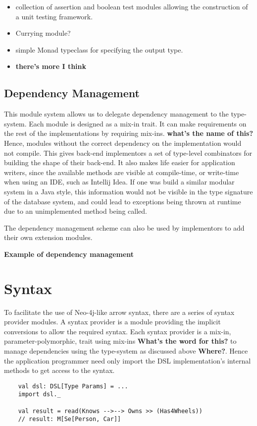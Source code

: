 \documentclass{report}
\newcommand \2[0]{\textbf{2}}
\newcommand \3[0]{\textbf{3}}
\newcommand{\todo}[1]{\textbf{#1}}
\begin{document}
\begin{itemize}
    \item collection of assertion and boolean test modules allowing the construction of a unit testing framework.
    \item Currying module?
    \item simple Monad typeclass for specifying the output type.
    \item \todo{there's more  I think}
\end{itemize}

\subsection{Dependency Management}
This module system allows us to delegate dependency management to the type-system. Each module is designed as a mix-in trait. It can make requirements on the rest of the implementations by requiring mix-ins. \todo{what's the name of this?} Hence, modules without the correct dependency on the implementation would not compile. This gives back-end implementors a set of type-level combinators for building the shape of their back-end. It also makes life easier for application writers, since the available methods are visible at compile-time, or write-time when using an IDE, such as Intellij Idea. If one was build a similar modular system in a Java style, this information would not be visible in the type signature of the database system, and could lead to exceptions being thrown at runtime due to an unimplemented method being called.

The dependency management scheme can also be used by implementors to add their own extension modules.

\todo{Example of dependency management}

\section{Syntax}
To facilitate the use of Neo-4j-like arrow syntax, there are a series of syntax provider modules. A syntax provider is a module providing the implicit conversions to allow the required syntax. Each syntax provider is a mix-in, parameter-polymorphic, trait using mix-ins \todo{What's the word for this?} to manage dependencies using the type-system as discussed above \todo{Where?}. Hence the application programmer need only import the DSL implementation's internal methods to get access to the syntax.

\begin{verbatim}
    val dsl: DSL[Type Params] = ...
    import dsl._

    val result = read(Knows -->--> Owns >> (Has4Wheels))
    // result: M[Se[Person, Car]]
\end{verbatim}
\end{document}
